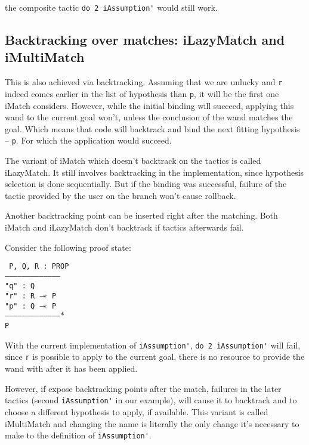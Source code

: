 the composite tactic \lstinline|do 2 iAssumption'| would still work.

\subsection{Backtracking over matches: iLazyMatch and iMultiMatch}

This is also achieved via backtracking.
Assuming that we are unlucky and \lstinline|r| indeed comes earlier in the list of hypothesis than \lstinline|p|, it will be the first one iMatch considers.
However, while the initial binding will succeed, applying this wand to the current goal won't, unless the conclusion of the wand matches the goal.
Which means that code will backtrack and bind the next fitting hypothesis -- \lstinline|p|.
For which the application would succeed.

The variant of iMatch which doesn't backtrack on the tactics is called iLazyMatch.
It still involves backtracking in the implementation, since hypothesis selection is done sequentially.
But if the binding was successful, failure of the tactic provided by the user on the branch won't cause rollback.

Another backtracking point can be inserted right after the matching.
Both iMatch and iLazyMatch don't backtrack if tactics afterwards fail.

Consider the following proof state:

\texttt{
P, Q, R : PROP\\
---------------------------------------\\
"q" : Q\\
"r" : R $\mathrel{-\mkern-6mu*}$ P\\
"p" : Q $\mathrel{-\mkern-6mu*}$ P\\
--------------------------------------$\ast$\\
P
}

With the current implementation of \lstinline|iAssumption'|, \lstinline|do 2 iAssumption'| will fail, since \lstinline|r| is possible to apply to the current goal, there is no resource to provide the wand with after it has been applied.

However, if expose backtracking points after the match, failures in the later tactics (second \lstinline|iAssumption'| in our example), will cause it to backtrack and
to choose a different hypothesis to apply, if available.
This variant is called iMultiMatch and changing the name is literally the only change it's necessary to make to the definition of \lstinline|iAssumption'|.


